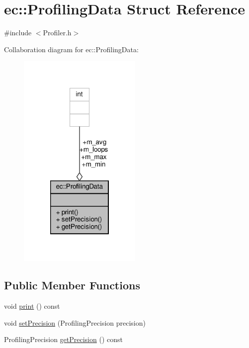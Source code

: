 \hypertarget{structec_1_1_profiling_data}{}\section{ec\+:\+:Profiling\+Data Struct Reference}
\label{structec_1_1_profiling_data}


{\ttfamily \#include $<$Profiler.\+h$>$}



Collaboration diagram for ec\+:\+:Profiling\+Data\+:\nopagebreak
\begin{figure}[H]
\begin{center}
\leavevmode
\includegraphics[width=168pt]{structec_1_1_profiling_data__coll__graph}
\end{center}
\end{figure}
\subsection*{Public Member Functions}
\begin{DoxyCompactItemize}
\item 
void \mbox{\hyperlink{structec_1_1_profiling_data_ab664a06ab3c6cad1328e417be7f5b558}{print}} () const
\item 
void \mbox{\hyperlink{structec_1_1_profiling_data_adf9ee1e2550aaf1b0859d5c3517aa360}{set\+Precision}} (Profiling\+Precision precision)
\item 
Profiling\+Precision \mbox{\hyperlink{structec_1_1_profiling_data_a08d24bb1ef0fbabe2a670b577f56782f}{get\+Precision}} () const
\end{DoxyCompactItemize}
